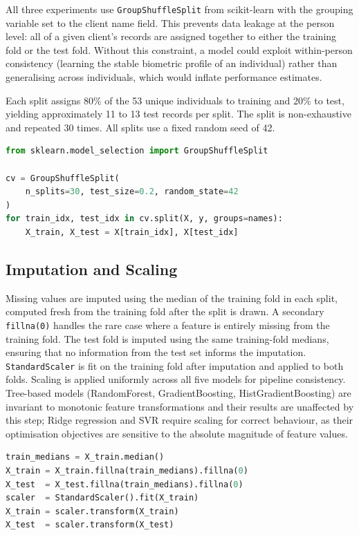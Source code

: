 \documentclass[11pt,a4paper]{report}
\begin{document}
All three experiments use \texttt{GroupShuffleSplit} from scikit-learn with the grouping variable
set to the client name field. This prevents data leakage at the person level: all of a given
client's records are assigned together to either the training fold or the test fold. Without this
constraint, a model could exploit within-person consistency (learning the stable biometric profile
of an individual) rather than generalising across individuals, which would inflate performance
estimates.

Each split assigns 80\% of the 53 unique individuals to training and 20\% to test, yielding
approximately 11 to 13 test records per split. The split is non-exhaustive and repeated 30 times.
All splits use a fixed random seed of 42.

\begin{lstlisting}[language=Python, caption={GroupShuffleSplit configuration used across all three experiments.}, label={lst:gss}]
from sklearn.model_selection import GroupShuffleSplit

cv = GroupShuffleSplit(
    n_splits=30, test_size=0.2, random_state=42
)
for train_idx, test_idx in cv.split(X, y, groups=names):
    X_train, X_test = X[train_idx], X[test_idx]
\end{lstlisting}

\subsection{Imputation and Scaling}

Missing values are imputed using the median of the training fold in each split, computed fresh from
the training fold after the split is drawn. A secondary \texttt{fillna(0)} handles the rare case
where a feature is entirely missing from the training fold. The test fold is imputed using the same
training-fold medians, ensuring that no information from the test set informs the imputation.
\texttt{StandardScaler} is fit on the training fold after imputation and applied to both folds. Scaling is applied uniformly across all five models for pipeline consistency. Tree-based models (RandomForest, GradientBoosting, HistGradientBoosting) are invariant to monotonic feature transformations and their results are unaffected by this step; Ridge regression and SVR require scaling for correct behaviour, as their optimisation objectives are sensitive to the absolute magnitude of feature values.

\begin{lstlisting}[language=Python, caption={Per-fold median imputation preventing data leakage.}, label={lst:impute}]
train_medians = X_train.median()
X_train = X_train.fillna(train_medians).fillna(0)
X_test  = X_test.fillna(train_medians).fillna(0)
scaler  = StandardScaler().fit(X_train)
X_train = scaler.transform(X_train)
X_test  = scaler.transform(X_test)
\end{lstlisting}
\end{document}
